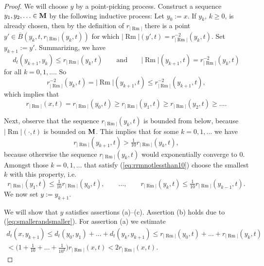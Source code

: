 \documentclass[11pt]{amsart}
\numberwithin{equation}{section}
\def\M{{\bf M}}
\DeclareMathOperator{\Rm}{Rm}
\newcommand{\rrm}{r_{|{\Rm}|}}
\numberwithin{equation}{section}
\begin{document}
\begin{proof}
We will choose $y$ by a point-picking process.
Construct a sequence $y_1, y_2, \ldots \in \M$ by the following inductive process:
Let $y_0 := x$.
If $y_k$, $k \geq 0$, is already chosen, then by the definition of $\rrm$ there is a point $y' \in \overline{B} (y_k, t, \rrm (y_k, t))$ for which $|{\Rm}| (y', t) = \rrm^{-2} (y_k, t)$.
Set $y_{k+1} := y'$.
Summarizing, we have
\[ d_t (y_{k+1}, y_k) \leq \rrm (y_k, t) \qquad \text{and} \qquad |{\Rm}| (y_{k+1}, t) = \rrm^{-2} (y_k, t) \]
for all $k = 0,1, \ldots$.
So
\[ \rrm^{-2} (y_k, t) = |{\Rm}| (y_{k+1}, t)  \leq \rrm^{-2} (y_{k+1}, t), \]
which implies that
\begin{equation} \label{eq:smallerandsmaller}
 \rrm (x,t) = \rrm (y_0, t) \geq \rrm (y_1, t) \geq \rrm (y_2, t) \geq \ldots . 
\end{equation}

Next, observe that the sequence $\rrm (y_k, t)$ is bounded from below, because $|{\Rm}| (\cdot, t)$ is bounded on $\M$.
This implies that for some $k = 0, 1, \ldots$ we have
\begin{equation} \label{eq:rrmnotlessthan10}
 \rrm (y_{k+1}, t) > \tfrac1{10} \rrm (y_k, t),
\end{equation}
because otherwise the sequence $\rrm (y_k, t)$ would exponentially converge to $0$.
Amongst those $k = 0,1, \ldots$ that satisfy (\ref{eq:rrmnotlessthan10}) choose the smallest $k$ with this property, i.e.
\[ \rrm (y_1, t) \leq \tfrac1{10} \rrm (y_0, t), \qquad \ldots, \qquad \rrm (y_k, t) \leq \tfrac1{10} \rrm (y_{k-1}, t) . \]
We now set $y := y_{k+1}$.

We will show that $y$ satisfies assertions (a)--(c).
Assertion (b) holds due to (\ref{eq:smallerandsmaller}).
For assertion (a) we estimate
\begin{multline*}
d_t (x, y_{k+1} ) \leq d_t (y_0, y_1)  + \ldots + d_t (y_k, y_{k+1}) \leq \rrm (y_0, t) + \dots + \rrm (y_k, t) \\
< \big(1 + \tfrac1{10} + \ldots + \tfrac1{10^k} \big) \rrm (x, t) < 2 \rrm (x,t).
\end{multline*}


\end{proof}
\end{document}
